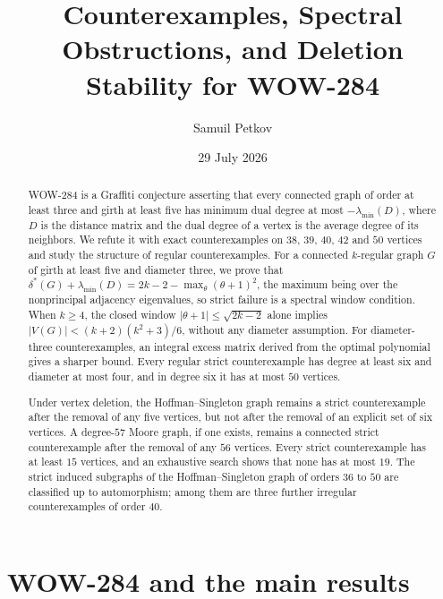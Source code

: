 \documentclass[a4paper,10pt,reqno]{amsart}
\title[Counterexamples and obstructions for WOW-284]
{Counterexamples, Spectral Obstructions, and Deletion Stability for WOW-284}
\author{Samuil Petkov}
\date{29 July 2026}
\theoremstyle{plain}
\theoremstyle{definition}
\theoremstyle{remark}
\begin{document}
\begin{abstract}
WOW-284 is a Graffiti conjecture asserting that every connected graph of order at least three and girth at least five has minimum dual degree at most \(-\lambda_{\min}(D)\), where \(D\) is the distance matrix and the dual degree of a vertex is the average degree of its neighbors. We refute it with exact counterexamples on \(38\), \(39\), \(40\), \(42\) and \(50\) vertices and study the structure of regular counterexamples. For a connected \(k\)-regular graph \(G\) of girth at least five and diameter three, we prove that \(\delta^*(G)+\lambda_{\min}(D)=2k-2-\max_\theta(\theta+1)^2\), the maximum being over the nonprincipal adjacency eigenvalues, so strict failure is a spectral window condition. When \(k\ge4\), the closed window \(|\theta+1|\le\sqrt{2k-2}\) alone implies \(|V(G)|<(k+2)(k^2+3)/6\), without any diameter assumption. For diameter-three counterexamples, an integral excess matrix derived from the optimal polynomial gives a sharper bound. Every regular strict counterexample has degree at least six and diameter at most four, and in degree six it has at most \(50\) vertices.

Under vertex deletion, the Hoffman--Singleton graph remains a strict counterexample after the removal of any five vertices, but not after the removal of an explicit set of six vertices. A degree-\(57\) Moore graph, if one exists, remains a connected strict counterexample after the removal of any \(56\) vertices. Every strict counterexample has at least \(15\) vertices, and an exhaustive search shows that none has at most \(19\). The strict induced subgraphs of the Hoffman--Singleton graph of orders \(36\) to \(50\) are classified up to automorphism; among them are three further irregular counterexamples of order \(40\).
\end{abstract}

\maketitle

\section{WOW-284 and the main results}\label{sec:introduction}
\end{document}
